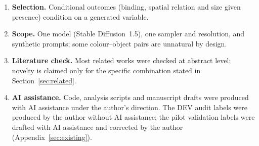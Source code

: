 \begin{enumerate}
\item \textbf{Selection.} Conditional outcomes (binding, spatial relation and size given presence) condition on a generated variable.
\item \textbf{Scope.} One model (Stable Diffusion~1.5), one sampler and resolution, and synthetic prompts; some colour--object pairs are unnatural by design.
\item \textbf{Literature check.} Most related works were checked at abstract level; novelty is claimed only for the specific combination stated in Section~\ref{sec:related}.
\item \textbf{AI assistance.} Code, analysis scripts and manuscript drafts were produced with AI assistance under the author's direction. The DEV audit labels were produced by the author without AI assistance; the pilot validation labels were drafted with AI assistance and corrected by the author (Appendix~\ref{sec:existing}).
\end{enumerate}
